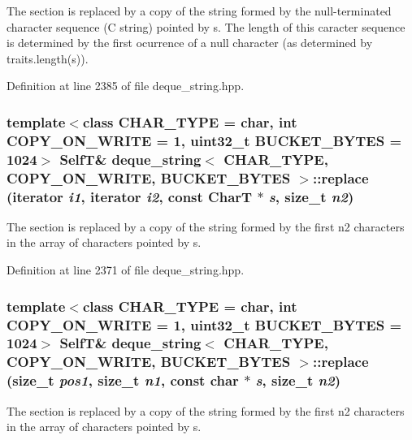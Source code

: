 The section is replaced by a copy of the string formed by the null-terminated character sequence (C string) pointed by s. The length of this caracter sequence is determined by the first ocurrence of a null character (as determined by traits.length(s)). 

Definition at line 2385 of file deque\_\-string.hpp.\hypertarget{classdeque__string_c69d24bbf034ed9ed36b29ced416eea4}{
\subsubsection[{replace}]{\setlength{\rightskip}{0pt plus 5cm}template$<$class CHAR\_\-TYPE  = char, int COPY\_\-ON\_\-WRITE = 1, uint32\_\-t BUCKET\_\-BYTES = 1024$>$ {\bf SelfT}\& {\bf deque\_\-string}$<$ CHAR\_\-TYPE, COPY\_\-ON\_\-WRITE, BUCKET\_\-BYTES $>$::replace (iterator {\em i1}, \/  iterator {\em i2}, \/  const CharT $\ast$ {\em s}, \/  size\_\-t {\em n2})}}
\label{classdeque__string_c69d24bbf034ed9ed36b29ced416eea4}


The section is replaced by a copy of the string formed by the first n2 characters in the array of characters pointed by s. 

Definition at line 2371 of file deque\_\-string.hpp.\hypertarget{classdeque__string_2d20e57466d40ab0b5605ca7c296c99f}{
\subsubsection[{replace}]{\setlength{\rightskip}{0pt plus 5cm}template$<$class CHAR\_\-TYPE  = char, int COPY\_\-ON\_\-WRITE = 1, uint32\_\-t BUCKET\_\-BYTES = 1024$>$ {\bf SelfT}\& {\bf deque\_\-string}$<$ CHAR\_\-TYPE, COPY\_\-ON\_\-WRITE, BUCKET\_\-BYTES $>$::replace (size\_\-t {\em pos1}, \/  size\_\-t {\em n1}, \/  const char $\ast$ {\em s}, \/  size\_\-t {\em n2})}}
\label{classdeque__string_2d20e57466d40ab0b5605ca7c296c99f}


The section is replaced by a copy of the string formed by the first n2 characters in the array of characters pointed by s. 

